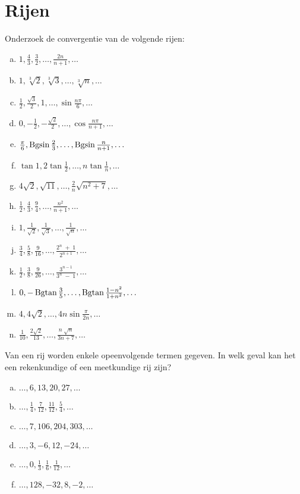 \documentclass[12pt,twoside]{article}
\begin{document}
\pagestyle{fancy}
\fancyhead[RE,LO]{}

\section{Rijen}

\begin{oefening}
Onderzoek de convergentie van de volgende rijen:
\begin{enumerate}[(a)]
  \item $1, \frac{4}{3}, \frac{3}{2}, \ldots, \frac{2n}{n+1}, \ldots$
  \item $1, \sqrt[3]{2}, \sqrt[3]{3}, \ldots, \sqrt[3]{n}, \ldots$
  \item $\frac{1}{2}, \frac{\sqrt{3}}{2}, 1, \ldots, \sin\frac{n\pi}{6}, \ldots$
  \item $0, -\frac{1}{2}, -\frac{\sqrt{2}}{2}, \ldots, \cos\frac{n\pi}{n+1}, \ldots$
  \item $\frac{\pi}{6}, \operatorname*{Bgsin}\frac{2}{3}, \ldots, \operatorname*{Bgsin}\frac{n}{n+1}, \ldots$
  \item $\tan 1, 2\tan\frac{1}{2}, \ldots, n\tan\frac{1}{n}, \ldots$
  \item $4\sqrt{2}, \sqrt{11}, \ldots, \frac{2}{n}\sqrt{n^2+7}, \ldots$
  \item $\frac{1}{2}, \frac{4}{3}, \frac{9}{4}, \ldots, \frac{n^2}{n+1}, \ldots$
  \item $1, \frac{1}{\sqrt{2}}, \frac{1}{\sqrt{3}}, \ldots, \frac{1}{\sqrt{n}}, \ldots$
  \item $\frac{3}{4}, \frac{5}{8}, \frac{9}{16}, \ldots, \frac{2^n\;+\; 1}{2^{n+1}}, \ldots$
  \item $\frac{1}{2}, \frac{3}{8}, \frac{9}{26}, \ldots, \frac{3^{n-1}}{3^n\;-\;1}, \ldots$
  \item $0, -\operatorname*{Bgtan}\frac{3}{5}, \ldots, \operatorname*{Bgtan}\frac{1-n^2}{1+n^2}, \ldots$
  \item $4, 4\sqrt{2}, \ldots, 4n\sin\frac{\pi}{2n}, \ldots$
  \item $\frac{1}{10}, \frac{2\sqrt{2}}{13}, \ldots, \frac{n\;\sqrt{n}}{3n+7}, \ldots$
\end{enumerate}
\end{oefening}

\begin{oefening}
Van een rij worden enkele opeenvolgende termen gegeven. In welk geval kan het een rekenkundige of een meetkundige rij zijn?
\begin{enumerate}[(a)]
  \item $\ldots, 6, 13, 20, 27, \ldots$
  \item $\ldots, \frac{1}{4}, \frac{7}{12}, \frac{11}{12}, \frac{5}{4}, \ldots$
  \item $\ldots, 7, 106, 204, 303, \ldots$
  \item $\ldots, 3, -6, 12, -24, \ldots$
  \item $\ldots, 0, \frac{1}{3}, \frac{1}{6}, \frac{1}{12}, \ldots$
  \item $\ldots, 128, -32, 8, -2, \ldots$
\end{enumerate}
\end{oefening}
\end{document}
